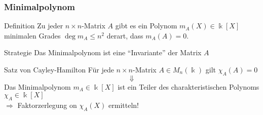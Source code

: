 %
%
%
\begin{frame}[t]
\frametitle{Minimalpolynom}
\begin{block}{Definition}
Zu jeder $n\times n$-Matrix $A$
gibt es ein Polynom $m_A(X)\in\Bbbk[X]$ minimalen Grades $\deg m_A\le n^2$
derart, dass $m_A(A)=0$.
\end{block}
\begin{block}{Strategie}
Das Minimalpolynom ist eine ``Invariante'' der Matrix $A$
\end{block}
\begin{block}{Satz von Cayley-Hamilton}
Für jede $n\times n$-Matrix $A\in M_n(\Bbbk)$ gilt $\chi_A(A)=0$
\[
\Downarrow
\]
Das Minimalpolynom $m_A\in \Bbbk[X]$ ist ein Teiler
des charakteristischen Polynoms $\chi_A\in \Bbbk[X]$
\\
$\Rightarrow $
Faktorzerlegung on $\chi_A(X)$ ermitteln!
\end{block}
\end{frame}
